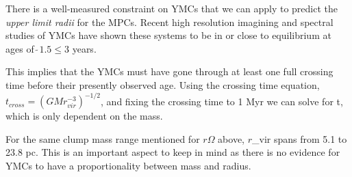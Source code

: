 There is a well-measured constraint on YMCs that we can apply to predict the \textit{upper limit radii} for the MPCs. Recent high resolution imagining and spectral studies of YMCs have shown these systems to be in or close to equilibrium at ages of  $\tilde~ 1.5 \leq 3$ years. \cite{Darwin_1900}

This implies that the YMCs must have gone through at least one full crossing time before their presently observed age. Using the crossing time equation, $t_{cross}=(GMr^{-3}_{vir})^{−1/2}$, and fixing the crossing time to 1 Myr we can solve for t, which is only dependent on the mass. \cite{1999}

For the same clump mass range mentioned for $r \Omega$ above, $r$_{vir} spans from 5.1 to 23.8 pc. This is an important aspect to keep in mind as there is no evidence for YMCs to have a proportionality between mass and radius. \cite{Bedini_2013}